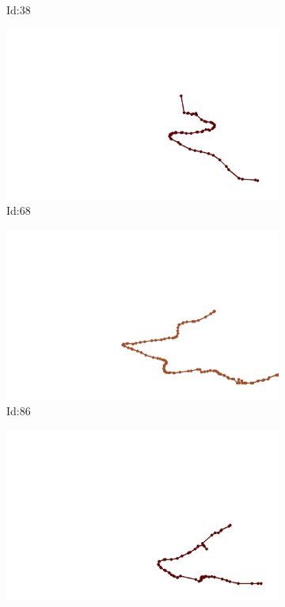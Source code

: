 \documentclass[12pt,twoside]{report}
\begin{document}
\begin{figure}
\begin{subfigure}[b]{0.20\textwidth}
\caption{Id:38}
\end{subfigure}
\begin{subfigure}[b]{0.20\textwidth}
\centering
\includegraphics[width=\textwidth]{../trajectories/68.png}
\caption{Id:68}
\end{subfigure}
\begin{subfigure}[b]{0.20\textwidth}
\centering
\includegraphics[width=\textwidth]{../trajectories/86.png}
\caption{Id:86}
\end{subfigure}
\begin{subfigure}[b]{0.20\textwidth}
\centering
\includegraphics[width=\textwidth]{../trajectories/152.png}

\end{subfigure}
\end{figure}
\end{document}
